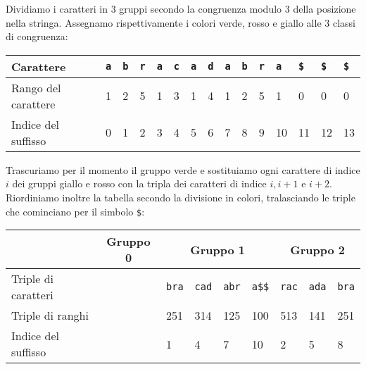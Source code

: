Dividiamo i caratteri in \(3\) gruppi secondo la congruenza modulo \(3\) della 
posizione nella stringa. Assegnamo rispettivamente i colori verde, rosso e giallo 
alle \(3\) classi di congruenza:
\begin{table}[h]
  \begin{tabularx}{\linewidth}{l*{14}{X}}
    Carattere              & \texttt{a} & \texttt{b} & \texttt{r} & \texttt{a}
                           & \texttt{c} & \texttt{a} & \texttt{d} & \texttt{a}
                           & \texttt{b} & \texttt{r} & \texttt{a} & \texttt{\$}
                           & \texttt{\$} & \texttt{\$} \\
    \hline
    Rango del carattere    & 1 & 2 & 5 & 1 & 3 & 1 & 4 & 1 & 2 & 5 & 1 & 0 & 0 & 0 \\
    Indice del suffisso    & 0 \cellcolor{green} & 1 \cellcolor{red} & 2 \cellcolor{yellow} 
                           & 3 \cellcolor{green} & 4 \cellcolor{red} & 5 \cellcolor{yellow} 
                           & 6 \cellcolor{green} & 7 \cellcolor{red} & 8 \cellcolor{yellow} 
                           & 9 \cellcolor{green} & 10 \cellcolor{red} & 11 \cellcolor{yellow} 
                           & 12 \cellcolor{green} & 13 \cellcolor{red} \\
  \end{tabularx}
\end{table}

Trascuriamo per il momento il gruppo verde e sostituiamo ogni carattere di indice 
\(i\) dei gruppi giallo e rosso con la tripla dei caratteri di indice \(i, i+1\) e 
\(i+2\). Riordiniamo inoltre la tabella secondo la divisione in colori,
tralasciando le triple che cominciano per il simbolo \texttt{\$}:
\begin{table}[h]
  \begin{tabularx}{\linewidth}{l*{11}{X}}
                        & \multicolumn{4}{c}{Gruppo 0 \cellcolor{green} } 
                        & \multicolumn{4}{c}{Gruppo 1 \cellcolor{red} } 
                        & \multicolumn{3}{c}{Gruppo 2 \cellcolor{yellow} }\\
    \hline
    Triple di caratteri & \multicolumn{4}{c}{\cellcolor{gray!25}}
                        & \texttt{bra} & \texttt{cad} & \texttt{abr} & \texttt{a\$\$}
                        & \texttt{rac} & \texttt{ada} & \texttt{bra} \\
    Triple di ranghi    & \multicolumn{4}{c}{\cellcolor{gray!25}}
                        & 251 & 314 & 125 & 100
                        & 513 & 141 & 251 \\
    Indice del suffisso & \multicolumn{4}{c}{\cellcolor{gray!25}}
                        & 1 & 4 & 7 & 10
                        & 2 & 5 & 8 \\
  \end{tabularx}
\end{table}

